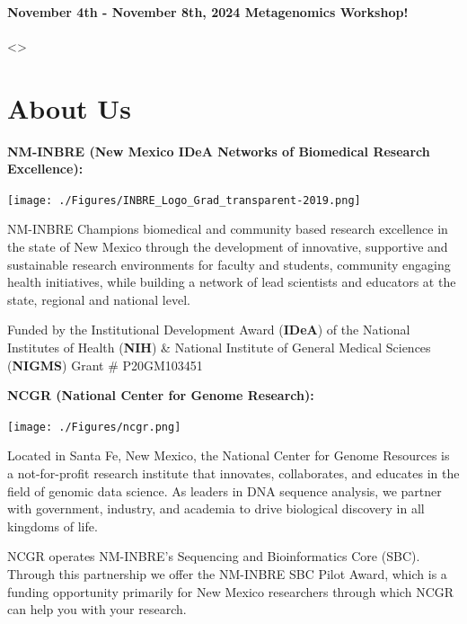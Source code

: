 \documentclass[
]{book}
\begin{document}
\hypertarget{november-4th---november-8th-2024-metagenomics-workshop}{%
\subsubsection*{November 4th - November 8th, 2024 \textbar{} Metagenomics Workshop!}\label{november-4th---november-8th-2024-metagenomics-workshop}}

\textless{}\textgreater{}

\hypertarget{about-us}{%
\chapter*{About Us}\label{about-us}}

\textbf{NM-INBRE (New Mexico IDeA Networks of Biomedical Research Excellence):}

\texttt{[image: ./Figures/INBRE\_Logo\_Grad\_transparent-2019.png]}

NM-INBRE Champions biomedical and community based research excellence in the state of New Mexico through the development of innovative, supportive and sustainable research environments for faculty and students, community engaging health initiatives, while building a network of lead scientists and educators at the state, regional and national level.

Funded by the Institutional Development Award (\textbf{IDeA}) of the National Institutes of Health (\textbf{NIH}) \& National Institute of General Medical Sciences (\textbf{NIGMS}) Grant \# P20GM103451

\textbf{NCGR (National Center for Genome Research):}

\texttt{[image: ./Figures/ncgr.png]}

Located in Santa Fe, New Mexico, the National Center for Genome Resources is a not-for-profit research institute that innovates, collaborates, and educates in the field of genomic data science. As leaders in DNA sequence analysis, we partner with government, industry, and academia to drive biological discovery in all kingdoms of life.

NCGR operates NM-INBRE's Sequencing and Bioinformatics Core (SBC). Through this partnership we offer the NM-INBRE SBC Pilot Award, which is a funding opportunity primarily for New Mexico researchers through which NCGR can help you with your research.
\end{document}
